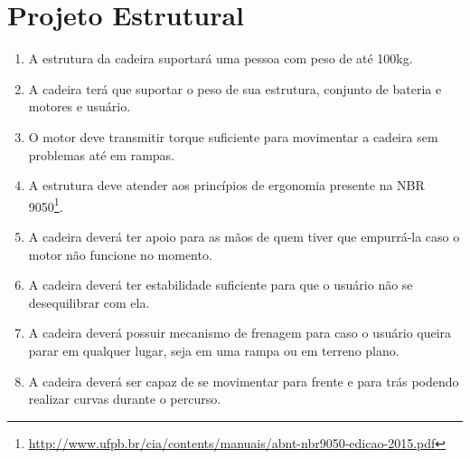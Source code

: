 \section{Projeto Estrutural}

\begin{enumerate}[resume*]
  \item A estrutura da cadeira suportará uma pessoa com peso de até 100kg.
  \item A cadeira terá que suportar o peso de sua estrutura, conjunto de bateria
    e motores e usuário.
  \item O motor deve transmitir torque suficiente para movimentar a cadeira sem
    problemas até em rampas.
  \item A estrutura deve atender aos princípios de ergonomia presente na NBR
    9050\footnote{\url{http://www.ufpb.br/cia/contents/manuais/abnt-nbr9050-edicao-2015.pdf}}.
  \item A cadeira deverá ter apoio para as mãos de quem tiver que empurrá-la
    caso o motor não funcione no momento.
  \item A cadeira deverá ter estabilidade suficiente para que o usuário não se
    desequilibrar com ela.
  \item A cadeira deverá possuir mecanismo de frenagem para caso o usuário
    queira parar em qualquer lugar, seja em uma rampa ou em terreno plano.
  \item A cadeira deverá ser capaz de se movimentar para frente e para trás
    podendo realizar curvas durante o percurso.
\end{enumerate}
